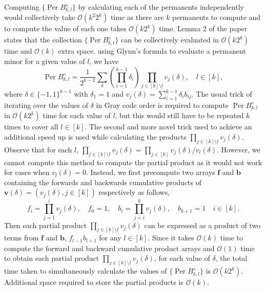 \documentclass[11pt]{article}
\theoremstyle{theorem}
\theoremstyle{theorem}
\theoremstyle{remark}
\theoremstyle{note}
\theoremstyle{plain}
\theoremstyle{definition}
\DeclareMathOperator*{\Per}{\mathrm{Per}}
\begin{document}
Computing $\{ \Per B_{k, l}^{\diamond} \}$ by calculating each of the permanents independently would collectively take $\mathcal{O}(k^2 2^k)$ time as there are $k$ permanents to compute and to compute the value of each one takes $\mathcal{O}(k 2^k)$ time. Lemma 2 of the paper states that the collection $\{ \Per B_{k, l}^{\diamond} \}$ can be collectively evaluated in $\mathcal{O}(k 2^k)$ time and $\mathcal{O}(k)$ extra space. using Glynn's formula to evaluate a permanent minor for a given value of $l$, we have
\begin{equation}
\Per B_{k, l}^{\diamond} = \frac{1}{2^{k-2}} \sum_\delta \left( \prod_{i=1}^{k-1} \delta_i \right) \prod_{j \in [k] \setminus l} v_j (\delta), \quad l \in [k],
\end{equation}
where $\delta \in \{-1, 1\}^{k-1}$ with $\delta_1 = 1$ and $v_j (\delta) = \sum_{i=1}^{k-1} \delta_i b_{ij}$.
The usual trick of iterating over the values of $\delta$ in Gray code order is required to compute $\Per B_{k, l}^{\diamond}$ in $\mathcal{O}(k2^k)$ time for each value of $l$, but this would still have to be repeated $k$ times to cover all $l \in [k]$. The second and more novel trick used to achieve an additional speed up is used while calculating the products $\prod_{j \in [k] \setminus l} v_j (\delta)$. Observe that for each $l$, $\prod_{j \in [k] \setminus l} v_j (\delta) = \prod_{j \in [k]} v_j (\delta) / v_l(\delta)$. However, we cannot compute this method to compute the partial product as it would not work for cases when $v_l(\delta) = 0$. Instead, we first precompute two arrays $\mathbf{f}$ and $\mathbf{b}$ containing the forwards and backwards cumulative products of $\mathbf{v}(\delta) = (v_j(\delta), j\in [k])$ respectively as follows,
\begin{equation}
f_i = \prod_{j=1}^i v_j(\delta), \quad f_0 = 1,
\quad b_i = \prod_{j=i}^k v_j(\delta), \quad b_{k+1} = 1 \quad i \in [k].
\end{equation}
Then each partial product $\prod_{j \in [k] \setminus l} v_j (\delta)$ can be expressed as a product of two terms from $\mathbf{f}$ and $\mathbf{b}$, $f_{l-1} b_{l+1}$ for any $l \in [k]$. Since it takes $\mathcal{O}(k)$ time to compute the forward and backward cumulative product arrays and $\mathcal{O}(1)$ time to obtain each partial product $\prod_{j \in [k] \setminus l} v_j (\delta)$, for each value of $\delta$, the total time taken to simultaneously calculate the values of $\{ \Per B_{k, l}^{\diamond} \}$ is $\mathcal{O}(k2^k)$. Additional space required to store the partial products is $\mathcal{O}(k)$.
\end{document}

